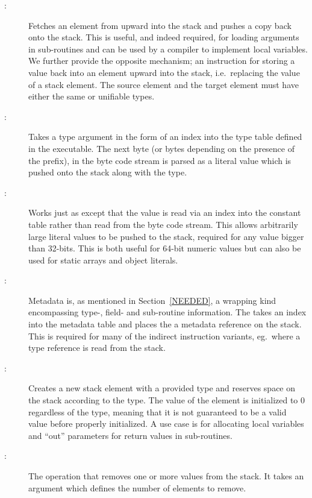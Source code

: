 \begin{description}

\item[:]

  Fetches an element from upward into the stack and pushes a copy back onto the
  stack. This is useful, and indeed required, for loading arguments in
  sub-routines and can be used by a compiler to implement local variables. We
  further provide the opposite mechanism; an instruction for storing a value
  back into an element upward into the stack, i.e.~replacing the value of a
  stack element. The source element and the target element must have either the
  same or unifiable types.

\item[:]

  Takes a type argument in the form of an index into the type table defined in
  the executable. The next byte (or bytes depending on the presence of the
   prefix), in the byte code stream is parsed as a literal value
  which is pushed onto the stack along with the type.

\item[:]

  Works just as  except that the value is read via an index
  into the constant table rather than read from the byte code stream. This
  allows arbitrarily large literal values to be pushed to the stack, required
  for any value bigger than 32-bits. This is both useful for 64-bit numeric
  values but can also be used for static arrays and object literals.

\item[:]

  Metadata is, as mentioned in Section~\ref{NEEDED}, a wrapping kind
  encompassing type-, field- and sub-routine information. The 
  takes an index into the metadata table and places the a metadata reference on
  the stack. This is required for many of the indirect instruction variants,
  eg.~where a type reference is read from the stack.

\item[:]

  Creates a new stack element with a provided type and reserves space on the
  stack according to the type. The value of the element is initialized to 0
  regardless of the type, meaning that it is not guaranteed to be a valid value
  before properly initialized. A use case is for allocating local variables and
  ``out'' parameters for return values in sub-routines.

\item[:]

  The operation that removes one or more values from the stack. It takes an
  argument which defines the number of elements to remove.

\end{description}

